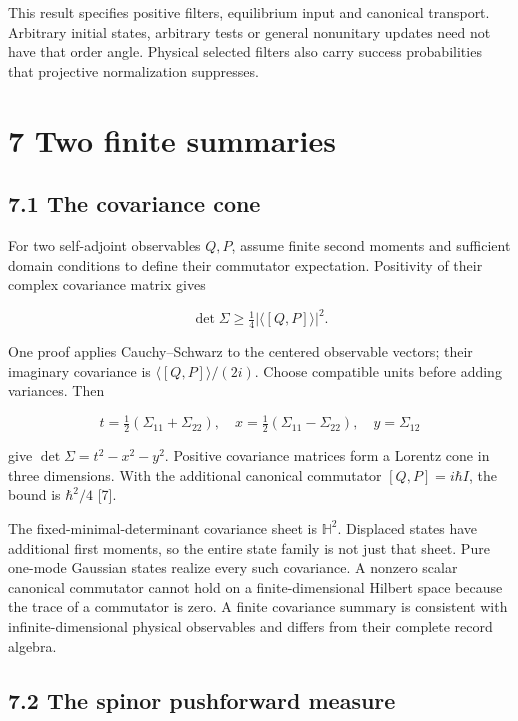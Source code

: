 \documentclass[
  11pt,
  a4paper,
]{article}
\begin{document}
This result specifies positive filters, equilibrium input and canonical transport. Arbitrary initial states, arbitrary tests or general nonunitary updates need not have that order angle. Physical selected filters also carry success probabilities that projective normalization suppresses.

\section{7 Two finite summaries}\label{two-finite-summaries}

\subsection{7.1 The covariance cone}\label{the-covariance-cone}

For two self-adjoint observables \(Q,P\), assume finite second moments and sufficient domain conditions to define their commutator expectation. Positivity of their complex covariance matrix gives

\[\det\Sigma\ge\tfrac14|\langle[Q,P]\rangle|^2.\]

One proof applies Cauchy--Schwarz to the centered observable vectors; their imaginary covariance is \(\langle[Q,P]\rangle/(2i)\). Choose compatible units before adding variances. Then

\[t=\tfrac12(\Sigma_{11}+\Sigma_{22}),\quad
x=\tfrac12(\Sigma_{11}-\Sigma_{22}),\quad y=\Sigma_{12}\]

give \(\det\Sigma=t^2-x^2-y^2\). Positive covariance matrices form a Lorentz cone in three dimensions. With the additional canonical commutator \([Q,P]=i\hbar I\), the bound is \(\hbar^2/4\) {[}7{]}.

The fixed-minimal-determinant covariance sheet is \(\mathbb H^2\). Displaced states have additional first moments, so the entire state family is not just that sheet. Pure one-mode Gaussian states realize every such covariance. A nonzero scalar canonical commutator cannot hold on a finite-dimensional Hilbert space because the trace of a commutator is zero. A finite covariance summary is consistent with infinite-dimensional physical observables and differs from their complete record algebra.

\subsection{7.2 The spinor pushforward measure}\label{the-spinor-pushforward-measure}
\end{document}

